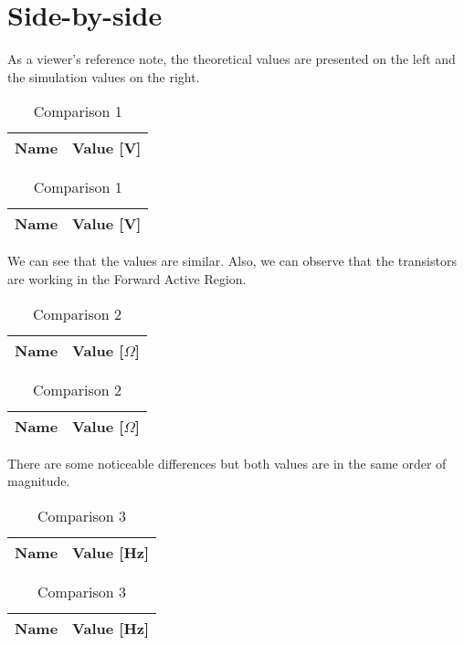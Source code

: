 \section{Side-by-side}
\label{sec:sbs}

As a viewer's reference note, the theoretical values are presented on the left and the simulation values on the right.

\begin{table}[h]
\begin{center}
  \begin{tabular}{|c|c|}
    \hline    
    {\bf Name} & {\bf Value [V]} \\ \hline
    
    \hline
  \end{tabular}
  \begin{tabular}{|c||c|}
    \hline    
    {\bf Name} & {\bf Value [V]} \\ \hline
    
    \hline
  \end{tabular}
  \caption{Comparison 1}
  \label{tab:comparison 1}
\end{center}
\end{table}
\FloatBarrier

We can see that the values are similar. Also, we can observe that the transistors are working in the Forward Active Region.

\begin{table}[h]
\begin{center}
  \begin{tabular}{|c|c|}
    \hline    
    {\bf Name} & {\bf Value [$\Omega$]} \\ \hline
    
    \hline
  \end{tabular}
  \begin{tabular}{|c||c|}
    \hline    
    {\bf Name} & {\bf Value [$\Omega$]} \\ \hline
    
    \hline
  \end{tabular}
  \caption{Comparison 2}
  \label{tab:comparison 2}
\end{center}
\end{table}

There are some noticeable differences but both values are in the same order of magnitude.


\begin{table}[h]
\begin{center}
  \begin{tabular}{|c|c|}
    \hline    
    {\bf Name} & {\bf Value [Hz]} \\ \hline
    
    \hline
  \end{tabular}
  \begin{tabular}{|c||c|}
    \hline    
    {\bf Name} & {\bf Value [Hz]} \\ \hline
    
    \hline
  \end{tabular}
  \caption{Comparison 3}
  \label{tab:comparison 3}
\end{center}
\end{table}

